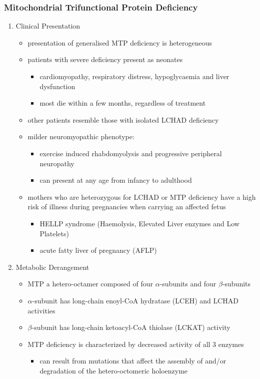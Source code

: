 \documentclass[12pt]{scrartcl}
\begin{document}
\subsubsection{Mitochondrial Trifunctional Protein Deficiency}
\label{sec:org6937d87}
\begin{enumerate}
\item Clinical Presentation
\label{sec:org4b4a48f}
\begin{itemize}
\item presentation of generalised MTP deficiency is heterogeneous
\item patients with severe deficiency present as neonates
\begin{itemize}
\item cardiomyopathy, respiratory distress, hypoglycaemia and liver dysfunction
\item most die within a few months, regardless of treatment
\end{itemize}
\item other patients resemble those with isolated LCHAD deficiency
\item milder neuromyopathic phenotype:
\begin{itemize}
\item exercise induced rhabdomyolysis and progressive peripheral
neuropathy
\item can present at any age from infancy to adulthood
\end{itemize}
\item mothers who are heterozygous for LCHAD or MTP deficiency have a high
risk of illness during pregnancies when carrying an affected fetus
\begin{itemize}
\item HELLP syndrome (Haemolysis, Elevated Liver enzymes and Low Platelets)
\item acute fatty liver of pregnancy (AFLP)
\end{itemize}
\end{itemize}
\item Metabolic Derangement
\label{sec:orgc5a9dfd}
\begin{itemize}
\item MTP a hetero-octamer composed of four \(\alpha\)-subunits and four
\(\beta\)-subunits
\item \(\alpha\)-subunit has long-chain enoyl-CoA hydratase (LCEH) and LCHAD
activities
\item \(\beta\)-subunit has long-chain ketoacyl-CoA thiolase (LCKAT) activity
\item MTP deficiency is characterized by decreased activity of all 3 enzymes
\begin{itemize}
\item can result from mutations that affect the assembly of and/or
degradation of the hetero-octomeric holoenzyme
\end{itemize}
\end{itemize}


\end{enumerate}
\end{document}
